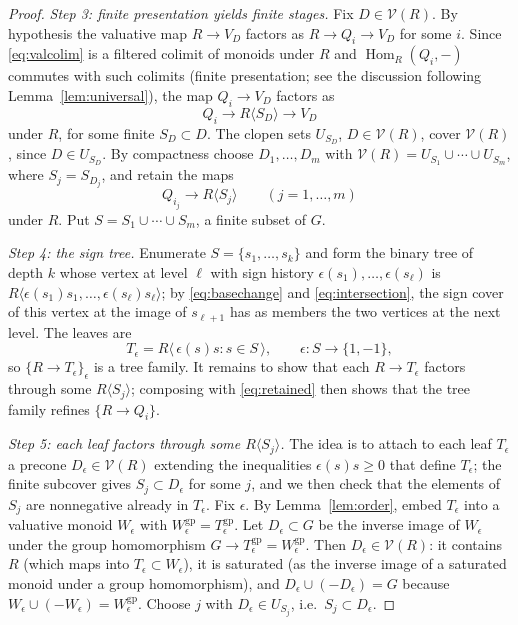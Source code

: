 \documentclass[11pt]{article}
\newcommand{\gp}{\mathrm{gp}}
\newcommand{\Hom}{\operatorname{Hom}}
\newcommand{\V}{\mathcal V}
\theoremstyle{definition}
\theoremstyle{remark}
\begin{document}
\begin{proof}
\emph{Step 3: finite presentation yields finite stages.}
Fix \(D\in\V(R)\).  By hypothesis the valuative map \(R\to V_D\) factors as
\(R\to Q_i\to V_D\) for some \(i\).  Since \eqref{eq:valcolim} is a
filtered colimit of monoids under \(R\) and \(\Hom_R(Q_i,-)\) commutes with
such colimits (finite presentation; see the discussion following
Lemma~\ref{lem:universal}), the map \(Q_i\to V_D\) factors as
\[
                       Q_i\longrightarrow R\langle S_D\rangle
                                      \longrightarrow V_D
\]
under \(R\), for some finite \(S_D\subset D\).  The clopen sets \(U_{S_D}\),
\(D\in\V(R)\), cover \(\V(R)\), since \(D\in U_{S_D}\).  By compactness choose
\(D_1,\dots,D_m\) with \(\V(R)=U_{S_1}\cup\cdots\cup U_{S_m}\), where
\(S_j=S_{D_j}\), and retain the maps
\begin{equation}
                         Q_{i_j}\longrightarrow R\langle S_j\rangle
                         \qquad(j=1,\dots,m)
                         \label{eq:retained}
\end{equation}
under \(R\).  Put \(S=S_1\cup\cdots\cup S_m\), a finite subset of \(G\).

\emph{Step 4: the sign tree.}
Enumerate \(S=\{s_1,\dots,s_k\}\) and form the binary tree of depth \(k\)
whose vertex at level \(\ell\) with sign history
\(\epsilon(s_1),\dots,\epsilon(s_\ell)\) is
\(R\langle\epsilon(s_1)s_1,\dots,\epsilon(s_\ell)s_\ell\rangle\); by
\eqref{eq:basechange} and \eqref{eq:intersection}, the sign cover of this
vertex at the image of \(s_{\ell+1}\) has as members the two vertices at the
next level.  The leaves are
\begin{equation}
      T_\epsilon
          =R\langle\,\epsilon(s)s:s\in S\,\rangle,
             \qquad \epsilon:S\longrightarrow\{1,-1\},
             \label{eq:signcover}
\end{equation}
so \(\{R\to T_\epsilon\}_\epsilon\) is a tree family.  It remains to show
that each \(R\to T_\epsilon\) factors through some
\(R\langle S_j\rangle\); composing with \eqref{eq:retained} then shows that
the tree family refines \(\{R\to Q_i\}\).

\emph{Step 5: each leaf factors through some \(R\langle S_j\rangle\).}
The idea is to attach to each leaf \(T_\epsilon\) a precone
\(D_\epsilon\in\V(R)\) extending the inequalities \(\epsilon(s)s\ge0\)
that define \(T_\epsilon\); the finite subcover gives
\(S_j\subset D_\epsilon\) for some \(j\), and we then check that the
elements of \(S_j\) are nonnegative already in \(T_\epsilon\).
Fix \(\epsilon\).  By Lemma~\ref{lem:order}, embed \(T_\epsilon\) into a
valuative monoid \(W_\epsilon\) with
\(W_\epsilon^{\gp}=T_\epsilon^{\gp}\).  Let \(D_\epsilon\subset G\) be the
inverse image of \(W_\epsilon\) under the group homomorphism
\(G\to T_\epsilon^{\gp}=W_\epsilon^{\gp}\).  Then \(D_\epsilon\in\V(R)\):
it contains \(R\) (which maps into \(T_\epsilon\subset W_\epsilon\)), it is
saturated (as the inverse image of a saturated monoid under a group
homomorphism), and \(D_\epsilon\cup(-D_\epsilon)=G\) because
\(W_\epsilon\cup(-W_\epsilon)=W_\epsilon^{\gp}\).  Choose \(j\) with
\(D_\epsilon\in U_{S_j}\), i.e.\ \(S_j\subset D_\epsilon\).


\end{proof}
\end{document}

